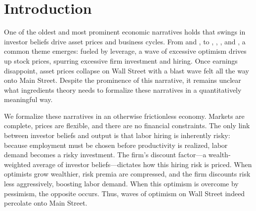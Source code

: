 \section{Introduction}
One of the oldest and most prominent economic narratives holds that swings in investor beliefs drive asset prices and business cycles. From \citet{sprague1910history} and \citet{fisher1933debt}, to \citet{keynes1936general}, \citet*{minsky1986stabilizing}, \citet*{kindleberger1996history}, and \citet*{Sh00}, a common theme emerges: fueled by leverage, a wave of excessive optimism drives up stock prices, spurring excessive firm investment and hiring. Once earnings disappoint, asset prices collapse on Wall Street with a blast wave felt all the way onto Main Street. Despite the prominence of this narrative, it remains unclear what ingredients theory needs to formalize these narratives in a quantitatively meaningful way.

We formalize these narratives in an otherwise frictionless economy. Markets are complete, prices are flexible, and there are no financial constraints. The only link between investor beliefs and output is that labor hiring is inherently risky: because employment must be chosen before productivity is realized, labor demand becomes a risky investment. The firm's discount factor---a wealth-weighted average of investor beliefs---dictates how this hiring risk is priced. When optimists grow wealthier, risk premia are compressed, and the firm discounts risk less aggressively, boosting labor demand. When this optimism is overcome by pessimism, the opposite occurs. Thus, waves of optimism on Wall Street indeed percolate onto Main Street.

